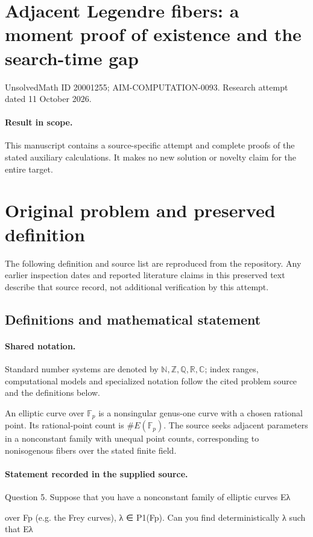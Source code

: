 \documentclass[11pt]{article}
\begin{document}
\section*{Adjacent Legendre fibers: a moment proof of existence and the search-time gap}
\noindent UnsolvedMath ID 20001255; AIM-COMPUTATION-0093. Research attempt dated 11 October 2026.
\paragraph{Result in scope.}This manuscript contains a source-specific attempt and complete proofs of the stated auxiliary calculations. It makes no new solution or novelty claim for the entire target.
\section{Original problem and preserved definition}
The following definition and source list are reproduced from the repository. Any earlier inspection dates and reported literature claims in this preserved text describe that source record, not additional verification by this attempt.
\subsection{Definitions and mathematical statement}

\paragraph{Shared notation.}Standard number systems are denoted by $\mathbb N,\mathbb Z,\mathbb Q,\mathbb R,\mathbb C$; index ranges, computational models and specialized notation follow the cited problem source and the definitions below.


An elliptic curve over $\mathbb F_p$ is a nonsingular genus-one curve with a chosen rational point. Its rational-point count is $\#E(\mathbb F_p)$. The source seeks adjacent parameters in a nonconstant family with unequal point counts, corresponding to nonisogenous fibers over the stated finite field.
\paragraph{Statement recorded in the supplied source.}
Question 5. Suppose that you have a nonconstant family of elliptic curves Eλ

over Fp (e.g. the Frey curves), λ ∈ P1(Fp). Can you find deterministically λ such that Eλ
\end{document}
